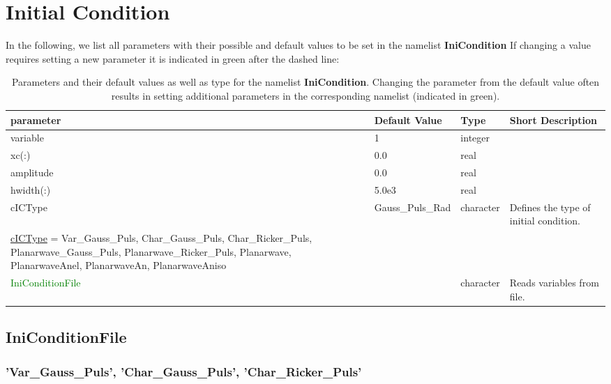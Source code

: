 \documentclass[12pt,twoside]{article}
\begin{document}
\newpage

\section{Initial Condition}
\label{sec-block-ic}

In the following, we list all parameters with their possible and default values to be set in the namelist  \textbf{IniCondition}
If changing a value requires setting a new
parameter it is indicated in green after the dashed line:\\

\begin{table}[H]
\caption{Parameters and their default values as well as type for the namelist \textbf{IniCondition}.
         Changing the parameter from the default value often results in setting additional parameters in the corresponding namelist (indicated in green).}
\begin{center}
\begin{tabular}{|p{4cm}|p{2.6cm}|p{2cm}|p{5cm}|}
\hline
parameter & Default Value & Type & Short Description \\
\hline
\hline
variable & 1 & integer & \\
xc(:) & 0.0 & real &\\
amplitude & 0.0 & real &\\
hwidth(:) & 5.0e3 & real &\\
\hline
cICType & Gauss\_Puls\_Rad & character & Defines the type of initial condition.\\
\hdashline
\uline{cICType} = Var\_Gauss\_Puls, Char\_Gauss\_Puls, Char\_Ricker\_Puls, Planarwave\_Gauss\_Puls, Planarwave\_Ricker\_Puls, Planarwave, PlanarwaveAnel,
PlanarwaveAn, PlanarwaveAniso & & &\\
\textcolor{green}{IniConditionFile} & & character & Reads variables from file.\\
\hline
\end{tabular}
\end{center}
\label{ini-table}
\end{table}

\newpage

\subsection{IniConditionFile}

\subsubsection{'Var\_Gauss\_Puls', 'Char\_Gauss\_Puls', 'Char\_Ricker\_Puls'}
\end{document}
